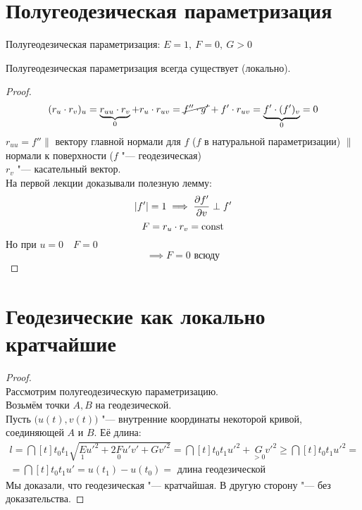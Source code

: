 \section{Полугеодезическая параметризация}

Полугеодезическая параметризация: $ E = 1, ~ F = 0, ~ G > 0 $

\begin{theorem}
	Полугеодезическая параметризация всегда существует (локально).
\end{theorem}

\begin{proof}
	$$ (r_u \cdot r_v)_u = \underbrace{r_{uu} \cdot r_v}_0 + r_u \cdot r_{uv} = \cancel{f'' \cdot g'} + f' \cdot r_{uv} = \underbrace{f' \cdot (f')_v}_0 = 0 $$
	$ r_{uu} = f'' \parallel $ вектору главной нормали для $ f $ (\as $ f $ в натуральной параметризации) $ \parallel $ нормали к поверхности (\as $ f $ "--- геодезическая) \\
	$ r_v $ "--- касательный вектор. \\
	На первой лекции доказывали полезную лемму:
	$$ |f'| = 1 \implies \frac{\partial {f'}}{\partial {v}} \perp f' $$
	$$ F = r_u \cdot r_v = \operatorname{const} $$
	Но при $ u = 0 \quad F = 0 $
	$$ \implies F = 0 \text{ всюду} $$
\end{proof}

\section{Геодезические как локально кратчайшие}

\begin{proof}
	\hfill \\
	Рассмотрим полугеодезическую параметризацию. \\
	Возьмём точки $ A, B $ на геодезической. \\
	Пусть $ \big( u(t), v(t) \big) $ "--- внутренние координаты некоторой кривой, соединяющей $ A $ и $ B $. Её длина:
	\begin{multline*}
		l = \dint[t]{t_0}{t_1}{\sqrt{\underset1Eu'^2 + 2\underset0Fu'v' + Gv'^2}} = \dint[t]{t_0}{t_1}{u'^2 + \underset{> 0}Gv'^2} \ge \dint[t]{t_0}{t_1}{u'^2} = \\
		= \dint[t]{t_0}{t_1}{u'} = u(t_1) - u(t_0) = \text{ длина геодезической}
	\end{multline*}
	Мы доказали, что геодезическая "--- кратчайшая. В другую сторону "--- без доказательства.
\end{proof}
